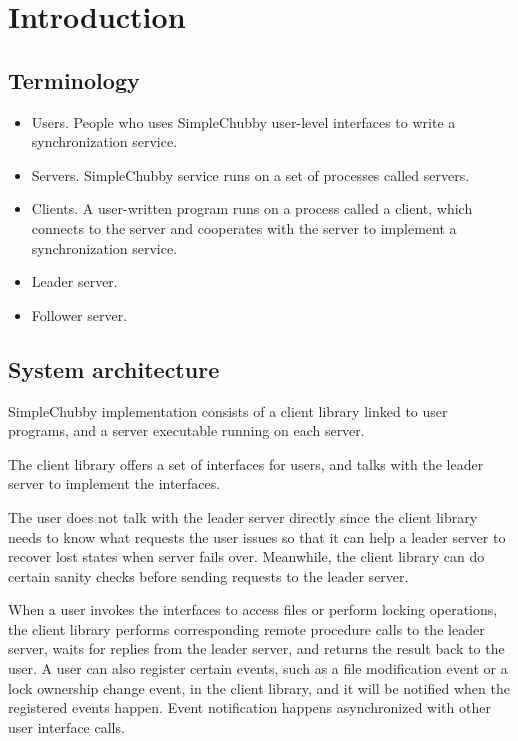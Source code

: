 \section{Introduction}

\subsection{Terminology}

\begin{itemize}
  \item Users.
  People who uses SimpleChubby user-level interfaces to write a synchronization service.
  \item Servers.
  SimpleChubby service runs on a set of processes called servers.
  \item Clients.
  A user-written program runs on a process called a client, which connects to the server
  and cooperates with the server to implement a synchronization service.
  \item Leader server.
  \item Follower server.
\end{itemize}

\subsection{System architecture}

SimpleChubby implementation consists of a client library linked to user programs,
and a server executable running on each server.

The client library offers a set of interfaces for users, and talks with the leader
server to implement the interfaces. 

The user does not talk with the leader server directly since the client library
needs to know what requests the user issues so that it can help a leader server
to recover lost states when server fails over.
Meanwhile, the client library can do certain sanity checks before sending requests
to the leader server.

When a user invokes the interfaces to access files or perform locking operations,
the client library performs corresponding remote procedure calls to the leader server,
waits for replies from the leader server, and returns the result back to the user.
A user can also register certain events,
such as a file modification event or a lock ownership change event, 
in the client library,
and it will be notified when the registered events happen.
Event notification happens asynchronized with other user interface calls.

